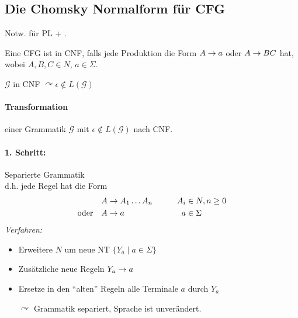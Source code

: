 \subsection{Die Chomsky Normalform für \ac*{CFG}}
Notw. für \ac{PL} + .
\begin{Def}[name={[\acs*{CFG} in \acs*{CNF}]}]
	Eine \ac{CFG} ist in \ac{CNF}, falls jede Produktion die Form $A\->a$ oder $A\->BC$ hat, wobei $A,B,C\in N$, $a\in\Sigma$.
\end{Def}
\begin{Beobachtung}
	$\mathcal{G}$ in \ac{CNF} $\curvearrowright \epsilon \notin L(\mathcal{G})$
\end{Beobachtung}
	
\paragraph*{Transformation} einer Grammatik $\mathcal{G}$ mit $\epsilon\notin L(\mathcal{G})$ nach \ac{CNF}.

\paragraph*{1. Schritt:} Separierte Grammatik\\
d.h. jede Regel hat die Form
\begin{alignat*}{2}
	A&\-> A_1\dots A_n &\qquad A_i&\in N,n\geq 0\\
	\text{oder}\quad A &\-> a & a&\in\Sigma
\end{alignat*}
\emph{Verfahren:}
\begin{itemize}
\item Erweitere $N$ um neue \acs{NT} $\{Y_a \mid a\in\Sigma\}$
\item Zusätzliche neue Regeln $Y_a\-> a$
\item Ersetze in den "`alten"' Regeln alle Terminale $a$ durch $Y_a$
\item[$\curvearrowright$] Grammatik separiert, Sprache ist unverändert.
\end{itemize}

